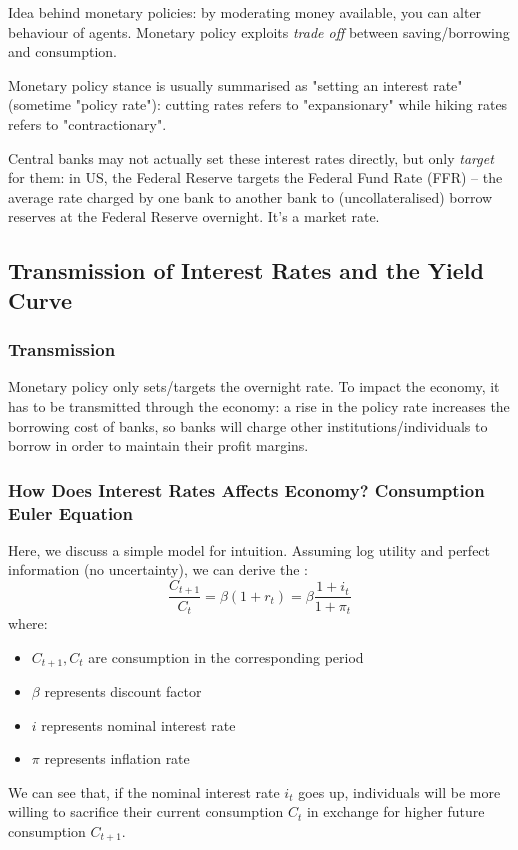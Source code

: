         Idea behind monetary policies: by moderating money available, you can alter behaviour of agents. Monetary policy exploits \emph{trade off} between saving/borrowing and consumption.

        Monetary policy stance is usually summarised as "setting an interest rate" (sometime "policy rate"): cutting rates refers to "expansionary" while hiking rates refers to "contractionary".

        Central banks may not actually set these interest rates directly, but only \emph{target} for them: in US, the Federal Reserve targets the Federal Fund Rate (FFR) -- the average rate charged by one bank to another bank to (uncollateralised) borrow reserves at the Federal Reserve overnight. It's a market rate.

    \subsection{Transmission of Interest Rates and the Yield Curve}

        \subsubsection{Transmission}
            Monetary policy only sets/targets the overnight rate. To impact the economy, it has to be transmitted through the economy: a rise in the policy rate increases the borrowing cost of banks, so banks will charge other institutions/individuals to borrow in order to maintain their profit margins.

        \subsubsection{How Does Interest Rates Affects Economy? Consumption Euler Equation}
            Here, we discuss a simple model for intuition. Assuming log utility and perfect information (no uncertainty), we can derive the :
            $$\frac{C_{t+1}}{C_t} = \beta (1+r_t) = \beta \frac{1+i_t}{1+\pi_t}$$
            where:
            \begin{itemize}
                \item $C_{t+1}, C_t$ are consumption in the corresponding period
                \item $\beta$ represents discount factor
                \item $i$ represents nominal interest rate
                \item $\pi$ represents inflation rate
            \end{itemize}
            We can see that, if the nominal interest rate $i_t$ goes up, individuals will be more willing to sacrifice their current consumption $C_t$ in exchange for higher future consumption $C_{t+1}$.

